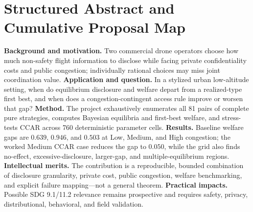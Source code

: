 \clearpage\onecolumn
\section{Structured Abstract and Cumulative Proposal Map}
\noindent\textbf{Background and motivation.} Two commercial drone operators choose how much non-safety flight information to disclose while facing private confidentiality costs and public congestion; individually rational choices may miss joint coordination value. \textbf{Application and question.} In a stylized urban low-altitude setting, when do equilibrium disclosure and welfare depart from a realized-type first best, and when does a congestion-contingent access rule improve or worsen that gap? \textbf{Method.} The project exhaustively enumerates all 81 pairs of complete pure strategies, computes Bayesian equilibria and first-best welfare, and stress-tests CCAR across 760 deterministic parameter cells. \textbf{Results.} Baseline welfare gaps are $0.639$, $0.946$, and $0.503$ at Low, Medium, and High congestion; the worked Medium CCAR case reduces the gap to $0.050$, while the grid also finds no-effect, excessive-disclosure, larger-gap, and multiple-equilibrium regions. \textbf{Intellectual merits.} The contribution is a reproducible, bounded combination of disclosure granularity, private cost, public congestion, welfare benchmarking, and explicit failure mapping---not a general theorem. \textbf{Practical impacts.} Possible SDG 9.1/11.2 relevance remains prospective and requires safety, privacy, distributional, behavioral, and field validation.

